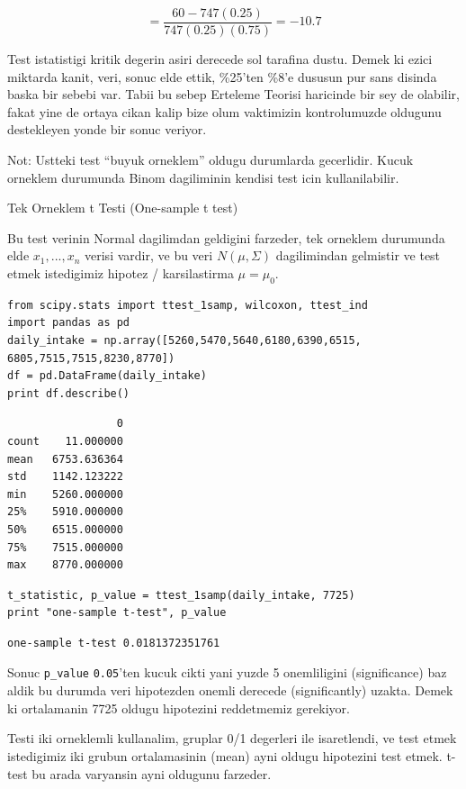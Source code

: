 \documentclass[12pt,fleqn]{article}\usepackage{../common}
\begin{document}
$$ = \frac{60-747(0.25)}{747(0.25)(0.75)} = -10.7 $$

Test istatistigi kritik degerin asiri derecede sol tarafina dustu. Demek ki
ezici miktarda kanit, veri, sonuc elde ettik, \%25'ten \%8'e dususun pur
sans disinda baska bir sebebi var. Tabii bu sebep Erteleme Teorisi
haricinde bir sey de olabilir, fakat yine de ortaya cikan kalip bize olum
vaktimizin kontrolumuzde oldugunu destekleyen yonde bir sonuc veriyor.

Not: Ustteki test ``buyuk orneklem'' oldugu durumlarda gecerlidir. Kucuk
orneklem durumunda Binom dagiliminin kendisi test icin kullanilabilir.

Tek Orneklem t Testi (One-sample t test)

Bu test verinin Normal dagilimdan geldigini farzeder, tek orneklem
durumunda elde $x_1,...,x_n$ verisi vardir, ve bu veri $N(\mu,\Sigma)$
dagilimindan gelmistir ve test etmek istedigimiz hipotez /
karsilastirma $\mu = \mu_0$. 

\begin{verbatim}
from scipy.stats import ttest_1samp, wilcoxon, ttest_ind
import pandas as pd
daily_intake = np.array([5260,5470,5640,6180,6390,6515, 6805,7515,7515,8230,8770])
df = pd.DataFrame(daily_intake)
print df.describe()
\end{verbatim}

\begin{verbatim}
                 0
count    11.000000
mean   6753.636364
std    1142.123222
min    5260.000000
25%    5910.000000
50%    6515.000000
75%    7515.000000
max    8770.000000
\end{verbatim}

\begin{verbatim}
t_statistic, p_value = ttest_1samp(daily_intake, 7725)
print "one-sample t-test", p_value
\end{verbatim}

\begin{verbatim}
one-sample t-test 0.0181372351761
\end{verbatim}

Sonuc \verb!p_value! \verb!0.05!'ten kucuk cikti yani
yuzde 5 onemliligini (significance) baz aldik bu durumda veri
hipotezden onemli derecede (significantly) uzakta. Demek ki
ortalamanin 7725 oldugu hipotezini reddetmemiz gerekiyor.

Testi iki orneklemli kullanalim, gruplar 0/1 degerleri ile
isaretlendi, ve test etmek istedigimiz iki grubun ortalamasinin (mean)
ayni oldugu hipotezini test etmek. t-test bu arada varyansin ayni
oldugunu farzeder.
\end{document}
